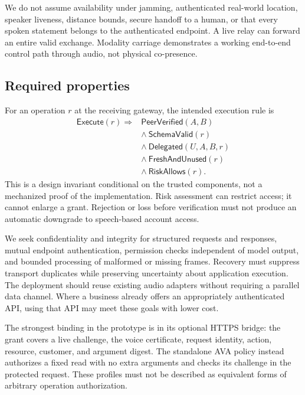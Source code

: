 We do not assume availability under jamming, authenticated real-world location,
speaker liveness, distance bounds, secure handoff to a human, or that every
spoken statement belongs to the authenticated endpoint. A live relay can
forward an entire valid exchange. Modality carriage demonstrates a working
end-to-end control path through audio, not physical co-presence.

\subsection{Required properties}
For an operation $r$ at the receiving gateway, the intended execution rule is
\begin{align}
\mathsf{Execute}(r) \Rightarrow {}& \mathsf{PeerVerified}(A,B) \nonumber\\
 &\land\ \mathsf{SchemaValid}(r) \nonumber\\
 &\land\ \mathsf{Delegated}(U,A,B,r) \nonumber\\
 &\land\ \mathsf{FreshAndUnused}(r) \nonumber\\
 &\land\ \mathsf{RiskAllows}(r).
\label{eq:execution}
\end{align}
This is a design invariant conditional on the trusted components, not a
mechanized proof of the implementation. Risk assessment can restrict access;
it cannot enlarge a grant. Rejection or loss before verification must not
produce an automatic downgrade to speech-based account access.

We seek confidentiality and integrity for structured requests and responses,
mutual endpoint authentication, permission checks independent of model output,
and bounded processing of malformed or missing frames. Recovery must suppress
transport duplicates while preserving uncertainty about application execution.
The deployment should reuse existing audio adapters without requiring a parallel
data channel. Where a business already offers an appropriately authenticated
API, using that API may meet these goals with lower cost.

The strongest binding in the prototype is in its optional HTTPS bridge: the
grant covers a live challenge, the voice certificate, request identity, action,
resource, customer, and argument digest. The standalone AVA policy instead
authorizes a fixed read with no extra arguments and checks its challenge in the
protected request. These profiles must not be described as equivalent forms of
arbitrary operation authorization.
